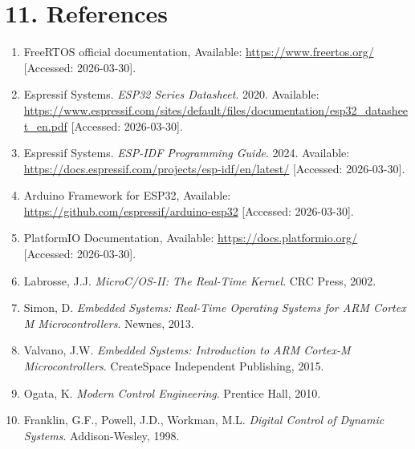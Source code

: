 \documentclass[12pt]{article}
\begin{document}
\section*{11. References}

\begin{enumerate}
    \item FreeRTOS official documentation, Available: \url{https://www.freertos.org/} [Accessed: 2026-03-30].

    \item Espressif Systems. \textit{ESP32 Series Datasheet}. 2020. Available: \url{https://www.espressif.com/sites/default/files/documentation/esp32_datasheet_en.pdf} [Accessed: 2026-03-30].

    \item Espressif Systems. \textit{ESP-IDF Programming Guide}. 2024. Available: \url{https://docs.espressif.com/projects/esp-idf/en/latest/} [Accessed: 2026-03-30].

    \item Arduino Framework for ESP32, Available: \url{https://github.com/espressif/arduino-esp32} [Accessed: 2026-03-30].

    \item PlatformIO Documentation, Available: \url{https://docs.platformio.org/} [Accessed: 2026-03-30].

    \item Labrosse, J.J. \textit{MicroC/OS-II: The Real-Time Kernel}. CRC Press, 2002.

    \item Simon, D. \textit{Embedded Systems: Real-Time Operating Systems for ARM Cortex M Microcontrollers}. Newnes, 2013.

    \item Valvano, J.W. \textit{Embedded Systems: Introduction to ARM Cortex-M Microcontrollers}. CreateSpace Independent Publishing, 2015.

    \item Ogata, K. \textit{Modern Control Engineering}. Prentice Hall, 2010.

    \item Franklin, G.F., Powell, J.D., Workman, M.L. \textit{Digital Control of Dynamic Systems}. Addison-Wesley, 1998.
\end{enumerate}

\end{document}
